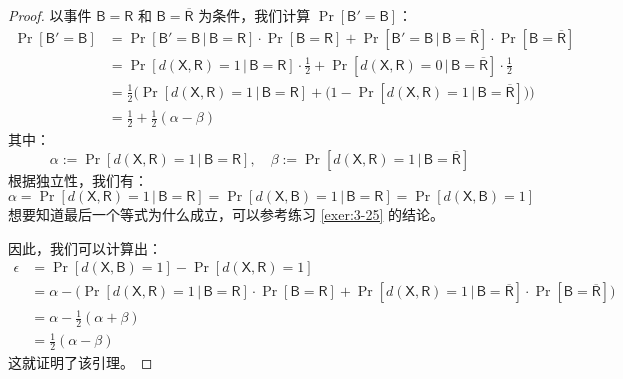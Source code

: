 \begin{proof}
以事件 $\boldsymbol{\mathsf{B}}=\boldsymbol{\mathsf{R}}$ 和 $\boldsymbol{\mathsf{B}}=\boldsymbol{\mathsf{\overline R}}$ 为条件，我们计算 $\Pr[\boldsymbol{\mathsf{B}}'=\boldsymbol{\mathsf{B}}]$：
\[
\begin{aligned}
\Pr[\boldsymbol{\mathsf{B}}'=\boldsymbol{\mathsf{B}}]
&=\Pr[\boldsymbol{\mathsf{B}}'=\boldsymbol{\mathsf{B}}\,|\,\boldsymbol{\mathsf{B}}=\boldsymbol{\mathsf{R}}]\cdot\Pr[\boldsymbol{\mathsf{B}}=\boldsymbol{\mathsf{R}}]+\Pr[\boldsymbol{\mathsf{B}}'=\boldsymbol{\mathsf{B}}\,|\,\boldsymbol{\mathsf{B}}=\boldsymbol{\mathsf{\overline R}}]\cdot\Pr[\boldsymbol{\mathsf{B}}=\boldsymbol{\mathsf{\overline R}}]\\
&=\Pr[d(\boldsymbol{\mathsf{X}},\boldsymbol{\mathsf{R}})=1\,|\,\boldsymbol{\mathsf{B}}=\boldsymbol{\mathsf{R}}]\cdot\frac{1}{2}+\Pr[d(\boldsymbol{\mathsf{X}},\boldsymbol{\mathsf{R}})=0\,|\,\boldsymbol{\mathsf{B}}=\boldsymbol{\mathsf{\overline R}}]\cdot\frac{1}{2}\\
&=\frac{1}{2}
\Big(\Pr[d(\boldsymbol{\mathsf{X}},\boldsymbol{\mathsf{R}})=1\,|\,\boldsymbol{\mathsf{B}}=\boldsymbol{\mathsf{R}}]+
\big(
1-\Pr[d(\boldsymbol{\mathsf{X}},\boldsymbol{\mathsf{R}})=1\,|\,\boldsymbol{\mathsf{B}}=\boldsymbol{\mathsf{\overline R}}]
\big)
\Big)\\
&=\frac{1}{2}+\frac{1}{2}(\alpha-\beta)
\end{aligned}
\]
其中：
\[
\alpha:=\Pr[d(\boldsymbol{\mathsf{X}},\boldsymbol{\mathsf{R}})=1\,|\,\boldsymbol{\mathsf{B}}=\boldsymbol{\mathsf{R}}],
\quad
\beta:=\Pr[d(\boldsymbol{\mathsf{X}},\boldsymbol{\mathsf{R}})=1\,|\,\boldsymbol{\mathsf{B}}=\boldsymbol{\mathsf{\overline R}}]
\]
根据独立性，我们有：
\[
\alpha=\Pr[d(\boldsymbol{\mathsf{X}},\boldsymbol{\mathsf{R}})=1\,|\,\boldsymbol{\mathsf{B}}=\boldsymbol{\mathsf{R}}]=\Pr[d(\boldsymbol{\mathsf{X}},\boldsymbol{\mathsf{B}})=1\,|\,\boldsymbol{\mathsf{B}}=\boldsymbol{\mathsf{R}}]=\Pr[d(\boldsymbol{\mathsf{X}},\boldsymbol{\mathsf{B}})=1]
\]
想要知道最后一个等式为什么成立，可以参考练习 \ref{exer:3-25} 的结论。

因此，我们可以计算出：
\[
\begin{aligned}
\epsilon
&=\Pr[d(\boldsymbol{\mathsf{X}},\boldsymbol{\mathsf{B}})=1]-\Pr[d(\boldsymbol{\mathsf{X}},\boldsymbol{\mathsf{R}})=1]\\
&=\alpha-
\Big(\Pr[d(\boldsymbol{\mathsf{X}},\boldsymbol{\mathsf{R}})=1\,|\,\boldsymbol{\mathsf{B}}=\boldsymbol{\mathsf{R}}]\cdot\Pr[\boldsymbol{\mathsf{B}}=\boldsymbol{\mathsf{R}}]+\Pr[d(\boldsymbol{\mathsf{X}},\boldsymbol{\mathsf{R}})=1\,|\,\boldsymbol{\mathsf{B}}=\boldsymbol{\mathsf{\overline R}}]\cdot\Pr[\boldsymbol{\mathsf{B}}=\boldsymbol{\mathsf{\overline R}}]
\Big)\\
&=\alpha-\frac{1}{2}(\alpha+\beta)\\
&=\frac{1}{2}(\alpha-\beta)
\end{aligned}
\]
这就证明了该引理。
\end{proof}

